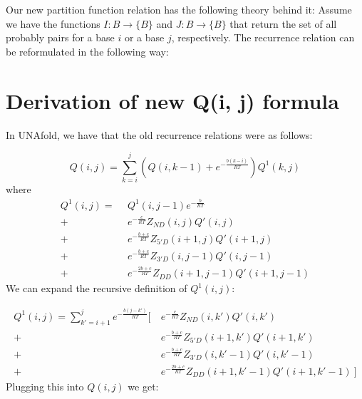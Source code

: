 Our new partition function relation has the following theory behind
it: Assume we have the functions $I : B \to \{B\}$ and $J : B \to
\{B\}$ that return the set of all probably pairs for a base $i$ or a
base $j$, respectively. The recurrence relation can be reformulated in
the following way:

\section{Derivation of new Q(i, j) formula}

In UNAfold, we have that the old recurrence relations were as follows:

\begin{equation}
Q(i,j) = \sum_{k=i}^j \left ( Q(i, k-1) + e^{-\frac{b(k-i)}{RT}}  \right )Q^1(k, j)
\end{equation}
where 
\begin{equation}
\begin{split}
Q^1(i, j) = \ \ & Q^1(i, j - 1) e^{-\frac{b}{RT}}  \\
 +\ & e^{-\frac{c}{RT} }Z_{ND}(i, j) Q'(i, j)  \\
+\ & e^{-\frac{b + c}{RT}}Z_{5'D}(i + 1, j)Q'(i + 1, j)  \\
+\ &  e^{-\frac{b + c}{RT}}Z_{3'D}(i, j-1)Q'(i, j - 1)  \\
+\ &  e^{-\frac{2b + c}{RT}}Z_{DD}(i + 1, j-1)Q'(i + 1, j-1) 
\end{split}
\end{equation}
\noindent
We can expand the recursive definition of $Q^1(i,j)$:

\begin{equation}
\begin{split}
Q^1(i, j) = \sum_{k' = i + 1}^j e^{-\frac{b(j - k')}{RT} } \bigg [ \ 
  & e^{-\frac{c}{RT} }Z_{ND}(i, k') Q'(i, k') \\
 +\ & e^{-\frac{b + c}{RT}}Z_{5'D}(i + 1, k')Q'(i + 1, k') \\ 
+\  & e^{-\frac{b + c}{RT}}Z_{3'D}(i, k'-1)Q'(i, k' - 1) \\
+\  & e^{-\frac{2b + c}{RT}}Z_{DD}(i + 1, k'-1)Q'(i + 1, k'-1) \   \bigg ]
\end{split}
\end{equation}
\noindent
Plugging this into $Q(i,j)$ we get:

